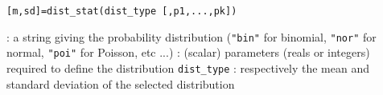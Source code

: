 \begin{mandesc}
\end{mandesc}
\begin{calling_sequence}
\begin{verbatim}
[m,sd]=dist_stat(dist_type [,p1,...,pk])  
\end{verbatim}
\end{calling_sequence}
\begin{parameters}
  \begin{varlist}
   : a string giving the probability distribution (\verb!"bin"! for binomial, \verb!"nor"!
   for normal, \verb!"poi"! for Poisson, etc ...)
   : (scalar) parameters (reals or integers) required to define the distribution \verb!dist_type!
    : respectively the mean and standard deviation of the selected distribution
  \end{varlist}
  \end{parameters}
  
